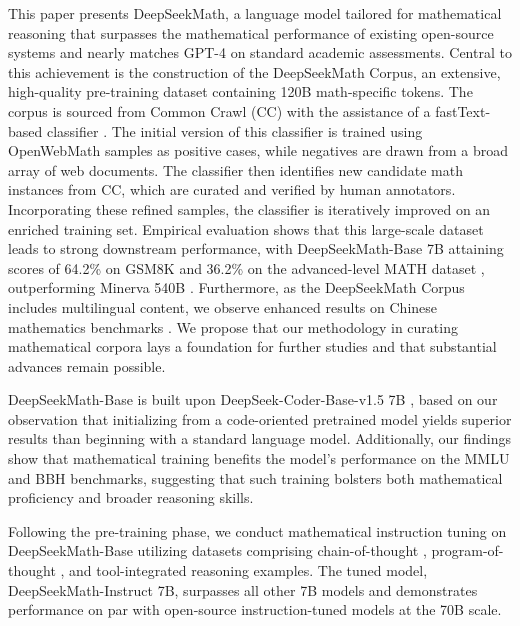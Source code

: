 This paper presents DeepSeekMath, a language model tailored for mathematical reasoning that surpasses the mathematical performance of existing open-source systems and nearly matches GPT-4 on standard academic assessments. Central to this achievement is the construction of the DeepSeekMath Corpus, an extensive, high-quality pre-training dataset containing 120B math-specific tokens. The corpus is sourced from Common Crawl (CC) with the assistance of a fastText-based classifier \citep{joulin2016fasttext}. The initial version of this classifier is trained using OpenWebMath \citep{openwebmath} samples as positive cases, while negatives are drawn from a broad array of web documents. The classifier then identifies new candidate math instances from CC, which are curated and verified by human annotators. Incorporating these refined samples, the classifier is iteratively improved on an enriched training set. Empirical evaluation shows that this large-scale dataset leads to strong downstream performance, with DeepSeekMath-Base 7B attaining scores of 64.2\% on GSM8K \citep{gsm8k} and 36.2\% on the advanced-level MATH dataset \citep{MATH}, outperforming Minerva 540B \citep{minerva}. Furthermore, as the DeepSeekMath Corpus includes multilingual content, we observe enhanced results on Chinese mathematics benchmarks \citep{wei2023cmath,agieval}. We propose that our methodology in curating mathematical corpora lays a foundation for further studies and that substantial advances remain possible.

DeepSeekMath-Base is built upon DeepSeek-Coder-Base-v1.5 7B \citep{deepseek-coder}, based on our observation that initializing from a code-oriented pretrained model yields superior results than beginning with a standard language model. Additionally, our findings show that mathematical training benefits the model’s performance on the MMLU \citep{mmlu} and BBH \citep{bbh} benchmarks, suggesting that such training bolsters both mathematical proficiency and broader reasoning skills.

Following the pre-training phase, we conduct mathematical instruction tuning on DeepSeekMath-Base utilizing datasets comprising chain-of-thought \citep{cot}, program-of-thought \citep{pot,pal}, and tool-integrated reasoning \citep{tora} examples. The tuned model, DeepSeekMath-Instruct 7B, surpasses all other 7B models and demonstrates performance on par with open-source instruction-tuned models at the 70B scale.

